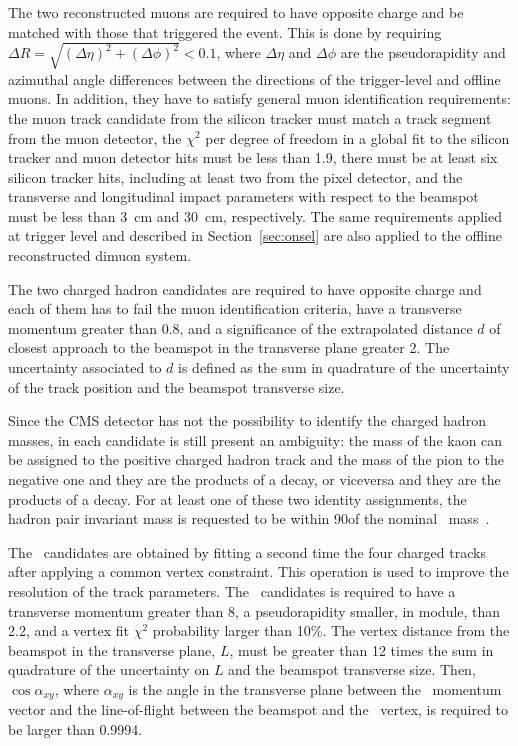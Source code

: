 The two reconstructed muons are required to have opposite charge and be matched with those that triggered the event. This is done by requiring $\Delta R = \sqrt{(\Delta\eta)^2+(\Delta\phi)^2}<0.1$, where $\Delta\eta$ and $\Delta\phi$ are the pseudorapidity and azimuthal angle differences between the directions of the trigger-level and offline muons.
In addition, they have to satisfy general muon identification requirements: the muon track candidate from the silicon  tracker must match a track segment from the muon detector, the $\chi^2$ per degree of freedom in a global fit to the silicon tracker and muon detector hits must be less than 1.9, there must be at least six silicon tracker hits, including at least two from the pixel detector, and the transverse and longitudinal impact parameters with respect to the beamspot must be less than \SI{3}{\centi\metre} and \SI{30}{\centi\metre}, respectively.
The same requirements applied at trigger level and described in Section~\ref{sec:onsel} are also applied to the offline reconstructed dimuon system.

The two charged hadron candidates are required to have opposite charge and each of them has to fail the muon identification criteria, have a transverse momentum greater than 0.8\GeV, and a significance of the extrapolated distance $d$ of closest approach to the beamspot in the transverse plane greater 2. The uncertainty associated to $d$ is defined as the sum in quadrature of the uncertainty of the track position and the beamspot transverse size.

Since the CMS detector has not the possibility to identify the charged hadron masses, in each candidate is still present an ambiguity: the mass of the kaon can be assigned to the positive charged hadron track and the mass of the pion to the negative one and they are the products of a \cPKstz decay, or viceversa and they are the products of a \cPAKstz decay.
For at least one of these two identity assignments, the hadron pair invariant mass is requested to be within 90\MeV of the nominal \cPKstz\ mass~\cite{PDG}.

The \PBz\ candidates are obtained by fitting a second time the four charged tracks after applying a common vertex constraint. This operation is used to improve the resolution of the track parameters.
The \PBz\ candidates is required to have a transverse momentum greater than 8\GeV, a pseudorapidity smaller, in module, than 2.2, and a vertex fit $\chi^2$ probability larger than 10\%.
The vertex distance from the beamspot in the transverse plane, $L$, must be greater than 12 times the sum in quadrature of the uncertainty on $L$ and the beamspot transverse size. Then, $\cos{\alpha_{xy}}$, where $\alpha_{xy}$ is the angle in the transverse plane between the \PBz\ momentum vector and the line-of-flight between the beamspot and the \PBz\ vertex, is required to be larger than 0.9994.

